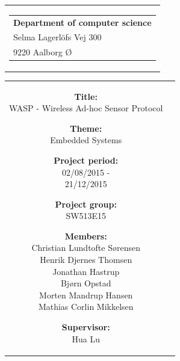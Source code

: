 
\thispagestyle{empty}

{\samepage 
\begin{tabular}{r}
	\parbox{\textwidth}{  
	\hfill \parbox{7cm}{\begin{tabular}{l} %
		{\small \textbf{Department of computer science}}\\
		{\small Selma Lagerlöfs Vej 300} \\
		{\small 9220 Aalborg Ø}
	\end{tabular}}
	}
\end{tabular}

\begin{tabular}{cc}
	\parbox{8cm}{
	\begin{description}
		\item { \textbf{Title:}}\\ 
			WASP - Wireless Ad-hoc Sensor Protocol
    		\item { \textbf{Theme:}}\\ 
			Embedded Systems\\
	\end{description}
	
	\parbox{8cm}{
	\begin{description}
		\item { \textbf{Project period:}}\\
			02/08/2015 -\\
			21/12/2015\\
 		\hspace{4cm}
		\item { \textbf{Project group:}}\\
  			SW513E15\\
 		\hspace{4cm}
		\item {\textbf{Members:}}\\
            Christian Lundtofte Sørensen\\
            Henrik Djernes Thomsen\\
            Jonathan Hastrup\\
            Bjørn Opstad\\
            Morten Mandrup Hansen\\
            Mathias Corlin Mikkelsen\\
		\hspace{2cm}
		\item { \textbf{Supervisor:}}\\
 			Hua Lu\\
  	\end{description} 
	}

}
\end{tabular}}
